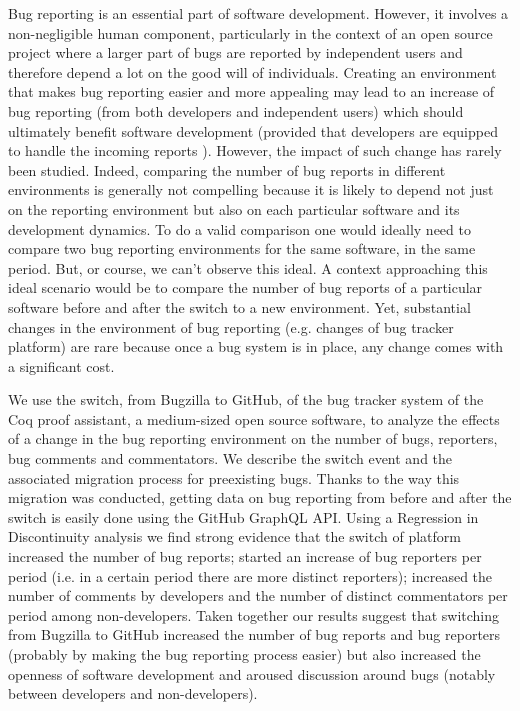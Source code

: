 \documentclass[runningheads]{llncs}
\begin{document}
Bug reporting is an essential part of software development. However, it involves
a non-negligible human component, particularly in the context of an open source project where a larger part of bugs are reported by independent users and therefore depend a lot on the good will of individuals. Creating an environment that makes bug reporting easier and more appealing may lead to an increase of bug reporting (from both developers and independent users) which should ultimately benefit  software development \cite{Bettenburg2008} (provided that developers are equipped to handle the incoming reports \cite{Anvika,Kanwal2012}). However, the impact of such change has rarely been studied. Indeed, comparing the number of bug reports in different environments is generally not compelling because it is likely to depend  not just on the reporting environment but also on each particular software and its development dynamics. To do a valid comparison one would ideally need to compare two bug reporting environments for the same software, in the same period. But, or course, we can't observe this ideal. A context approaching this ideal scenario would be to compare the number of bug reports of a particular software before and after the switch to a new environment. Yet, substantial changes in the environment of bug reporting (e.g. changes of bug tracker platform) are rare because once a bug system is in place, any change comes with a significant cost. 

We use the switch, from Bugzilla to GitHub, of the bug tracker system of the Coq proof assistant, a medium-sized open source software, to analyze the  effects of a change in the bug reporting environment on the number of bugs, reporters, bug comments and commentators. We describe the switch event and the associated migration process for preexisting bugs. Thanks to the way this migration was conducted, getting data on bug reporting from before and after the switch is easily done using the GitHub GraphQL API. Using a Regression in Discontinuity analysis we find strong evidence that the switch of platform increased the number of bug reports; started an increase of bug reporters per period (i.e. in a certain period there are more distinct reporters); increased the number of comments by developers and the number of distinct commentators per period among non-developers. Taken together our results suggest that switching from Bugzilla to GitHub increased the number of bug reports and bug reporters (probably by making the bug reporting process easier) but also increased the openness of software development and aroused discussion around bugs (notably between developers and non-developers).
\end{document}
